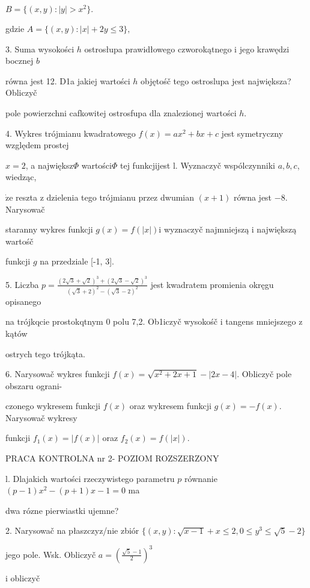 \documentclass[a4paper,12pt]{article}
\begin{document}
$B=\{(x,y):|y|>x^{2}\}.$

gdzie $A = \{(x,y):|x|+2y\leq 3\},$

3. Suma wysokości $h$ ostrosłupa prawidłowego czworokątnego $\mathrm{i}$ jego krawędzi bocznej $b$

równa jest 12. D1a jakiej wartości $h$ objętośč tego ostroslupa jest największa? Obliczyč

pole powierzchni cafkowitej ostrosfupa dla znalezionej wartości $h.$

4. Wykres trójmianu kwadratowego $f(x)=ax^{2}+bx+c$ jest symetryczny względem prostej

$x=2$, a największ$\Phi$ wartości$\Phi$ tej funkcjijest l. Wyznaczyč wspólczynniki $a, b, c$, wiedząc,

$\dot{\mathrm{z}}\mathrm{e}$ reszta $\mathrm{z}$ dzielenia tego trójmianu przez dwumian $(x+1)$ równa jest $-8$. Narysowač

staranny wykres funkcji $g(x) = f(|x|) \mathrm{i}$ wyznaczyč najmniejszą $\mathrm{i}$ największą wartośč

funkcji $g$ na przedziale [-1, 3].

5. Liczba $p=\displaystyle \frac{(2\sqrt{3}+\sqrt{2})^{3}+(2\sqrt{3}-\sqrt{2})^{3}}{(\sqrt{3}+2)^{2}-(\sqrt{3}-2)^{2}}$ jest kwadratem promienia okręgu opisanego

na trójkqcie prostokqtnym $0$ polu 7,2. Ob1iczyč wysokośč $\mathrm{i}$ tangens mniejszego $\mathrm{z}$ kątów

ostrych tego trójkąta.

6. Narysowač wykres funkcji $f(x)=\sqrt{x^{2}+2x+1}-|2x-4|$. Obliczyč pole obszaru ograni-

czonego wykresem funkcji $f(x)$ oraz wykresem funkcji $g(x)=-f(x)$. Narysowač wykresy

funkcji $f_{1}(x)=|f(x)|$ oraz $f_{2}(x)=f(|x|).$





PRACA KONTROLNA nr 2- POZIOM ROZSZERZONY

l. Dlajakich wartości rzeczywistego parametru $p$ równanie $(p-1)x^{2}-(p+1)x-1=0$ ma

dwa rózne pierwiastki ujemne?

2. Narysowač na płaszczyz/nie zbiór $\{(x,y):\sqrt{x-1}+x\leq 2,0\leq y^{3}\leq\sqrt{5}-2\}$

jego pole. Wsk. Obliczyč $a=(\displaystyle \frac{\sqrt{5}-1}{2})^{3}$

i obliczyč
\end{document}
